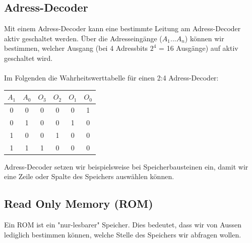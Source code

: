 \documentclass{report}
\begin{document}
\subsection{Adress-Decoder}
Mit einem Adress-Decoder kann eine bestimmte Leitung am Adress-Decoder aktiv geschaltet werden. Über die Adresseingänge ($A_1 ... A_n$) können wir bestimmen, welcher Ausgang (bei 4 Adressbits $2^4$ = 16 Ausgänge) auf aktiv geschaltet wird.
\\\\
Im Folgenden die Wahrheitswerttabelle für einen 2:4 Adress-Decoder:
\begin{center}\begin{tabular}{c c | c c c c}
$A_1$ & $A_0$ & $O_3$ & $O_2$ & $O_1$ & $O_0$ \\ \hline
0 & 0 & 0 & 0 & 0 & 1\\
0 & 1 & 0 & 0 & 1 & 0\\
1 & 0 & 0 & 1 & 0 & 0\\
1 & 1 & 1 & 0 & 0 & 0\end{tabular}\end{center}
Adress-Decoder setzen wir beispielsweise bei Speicherbausteinen ein, damit wir eine Zeile oder Spalte des Speichers auswählen können.
\subsection{Read Only Memory (ROM)}
Ein ROM ist ein "nur-lesbarer" Speicher. Dies bedeutet, dass wir von Aussen lediglich bestimmen können, welche Stelle des Speichers wir abfragen wollen.
\end{document}
